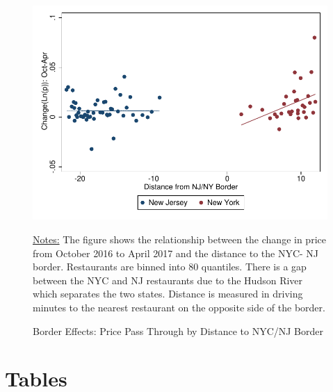 \documentclass[11pt]{article}
\begin{document}
\begin{figure}[H]
\centering
\caption{Border Effects:  Price Pass Through by Distance to NYC/NJ Border}
\includegraphics[scale=.75]{gh_dist.pdf}

{\footnotesize \raggedright \underline{Notes:} The figure shows the relationship between the change in price from October 2016 to April 2017 and the distance to the NYC- NJ border. Restaurants are binned into 80 quantiles. There is a gap between the NYC and NJ restaurants due to the Hudson River which separates the two states. Distance is measured in driving minutes to the nearest restaurant on the opposite side of the border. \par }

\end{figure}
%

\vspace*{\fill}


\newpage 

\section{Tables}

\vspace*{\fill}
\end{document}
